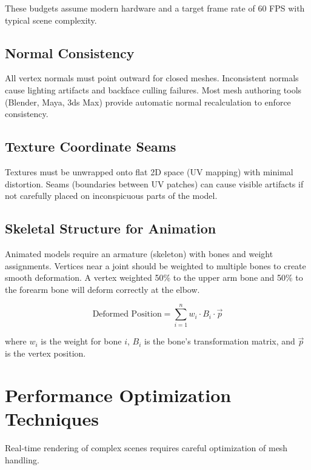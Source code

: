 These budgets assume modern hardware and a target frame rate of 60 FPS with typical scene complexity.

\subsection{Normal Consistency}

All vertex normals must point outward for closed meshes. Inconsistent normals cause lighting artifacts and backface culling failures. Most mesh authoring tools (Blender, Maya, 3ds Max) provide automatic normal recalculation to enforce consistency.

\subsection{Texture Coordinate Seams}

Textures must be unwrapped onto flat 2D space (UV mapping) with minimal distortion. Seams (boundaries between UV patches) can cause visible artifacts if not carefully placed on inconspicuous parts of the model.

\subsection{Skeletal Structure for Animation}

Animated models require an armature (skeleton) with bones and weight assignments. Vertices near a joint should be weighted to multiple bones to create smooth deformation. A vertex weighted 50\% to the upper arm bone and 50\% to the forearm bone will deform correctly at the elbow.

\begin{equation}
    \text{Deformed Position} = \sum_{i=1}^{n} w_i \cdot B_i \cdot \vec{p}
\end{equation}

where $w_i$ is the weight for bone $i$, $B_i$ is the bone's transformation matrix, and $\vec{p}$ is the vertex position.

\section{Performance Optimization Techniques}

Real-time rendering of complex scenes requires careful optimization of mesh handling.

